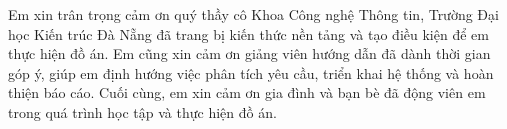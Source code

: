 \begin{acknowledgments}

Em xin trân trọng cảm ơn quý thầy cô Khoa Công nghệ Thông tin, Trường Đại
học Kiến trúc Đà Nẵng đã trang bị kiến thức nền tảng và tạo điều kiện để em
thực hiện đồ án. Em cũng xin cảm ơn giảng viên hướng dẫn đã dành thời gian
góp ý, giúp em định hướng việc phân tích yêu cầu, triển khai hệ thống và
hoàn thiện báo cáo. Cuối cùng, em xin cảm ơn gia đình và bạn bè đã động
viên em trong quá trình học tập và thực hiện đồ án.

\vspace{1.4em}
\hfill{}

\end{acknowledgments}
